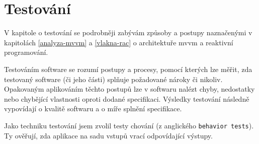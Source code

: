 \chapter{Testování}\label{testovani}

V kapitole o testování se podrobněji zabývám způsoby a postupy naznačenými v kapitolách \ref{analyza-mvvm} a \ref{vlakna-rac} o architektuře \acrshort{mvvm} a reaktivní programování.

Testováním software se rozumí postupy a procesy, pomocí kterých lze měřit, zda testovaný software (či jeho části) splňuje požadované nároky či nikoliv.
Opakovaným aplikováním těchto postupů lze v softwaru nalézt chyby, nedostatky nebo chybějící vlastnosti oproti dodané specifikaci.
Výsledky testování následně vypovídají o kvalitě softwaru a o míře splnění specifikace. \cite{software-testing-definition}

\bigskip

Jako techniku testování jsem zvolil testy chování (z anglického \texttt{behavior tests}).
Ty ověřují, zda aplikace na sadu vstupů vrací odpovídající výstupy.







